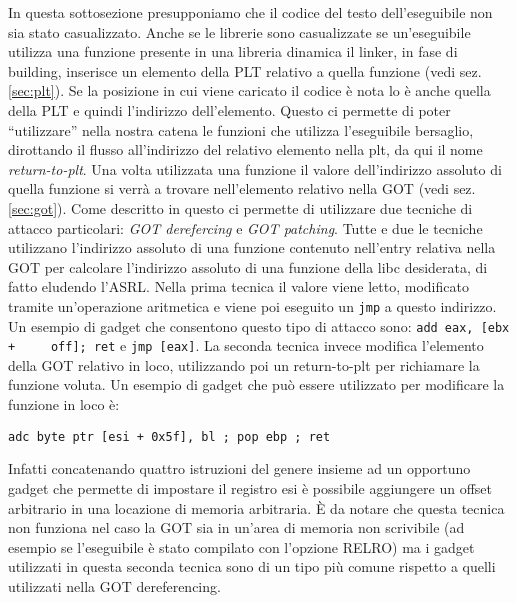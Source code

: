 In questa sottosezione presupponiamo che il codice del testo
dell'eseguibile non sia stato casualizzato. Anche se le librerie sono
casualizzate se un'eseguibile utilizza una funzione presente in una
libreria dinamica il linker, in fase di building, inserisce un
elemento della PLT relativo a quella funzione (vedi
sez. \ref{sec:plt}). Se la posizione in cui viene caricato il codice è
nota lo è anche quella della PLT e quindi l'indirizzo
dell'elemento. Questo ci permette di poter ``utilizzare'' nella nostra
catena le funzioni che utilizza l'eseguibile bersaglio, dirottando il
flusso all'indirizzo del relativo elemento nella plt, da qui il nome
\emph{return-to-plt}. Una volta utilizzata una funzione il valore
dell'indirizzo assoluto di quella funzione si verrà a trovare
nell'elemento relativo nella GOT (vedi sez. \ref{sec:got}). Come
descritto in \cite{roglia:2009} questo ci permette di utilizzare due
tecniche di attacco particolari: \emph{GOT derefercing} e \emph{GOT
  patching}. Tutte e due le tecniche utilizzano l'indirizzo assoluto
di una funzione contenuto nell'entry relativa nella GOT per calcolare
l'indirizzo assoluto di una funzione della libc desiderata, di fatto
eludendo l'ASRL. Nella prima tecnica il valore viene letto, modificato
tramite un'operazione aritmetica e viene poi eseguito un
\lstinline{jmp} a questo indirizzo. Un esempio di gadget che
consentono questo tipo di attacco sono: \lstinline{add eax, [ebx +
    off]; ret} e \lstinline{jmp [eax]}. La seconda tecnica invece
modifica l'elemento della GOT relativo in loco, utilizzando poi un
return-to-plt per richiamare la funzione voluta. Un esempio di gadget
che può essere utilizzato per modificare la funzione in loco è:

\lstinline{adc byte ptr [esi + 0x5f], bl ; pop ebp ; ret}

Infatti concatenando quattro istruzioni del genere insieme ad un
opportuno gadget che permette di impostare il registro esi è possibile
aggiungere un offset arbitrario in una locazione di memoria
arbitraria. È da notare che questa tecnica non funziona nel caso la
GOT sia in un'area di memoria non scrivibile (ad esempio se
l'eseguibile è stato compilato con l'opzione RELRO) ma i gadget
utilizzati in questa seconda tecnica sono di un tipo più comune
rispetto a quelli utilizzati nella GOT dereferencing.


